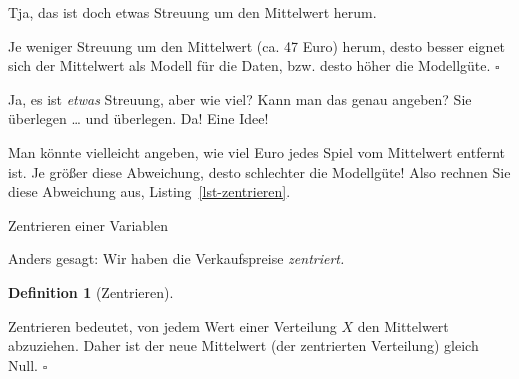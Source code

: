 \documentclass[
  letterpaper,
  oneside,
  open=any]{scrbook}
\newenvironment{Shaded}{\begin{snugshade}}{\end{snugshade}}
\newcommand{\AttributeTok}[1]{\textcolor[rgb]{0.40,0.45,0.13}{#1}}
\newcommand{\FloatTok}[1]{\textcolor[rgb]{0.68,0.00,0.00}{#1}}
\newcommand{\FunctionTok}[1]{\textcolor[rgb]{0.28,0.35,0.67}{#1}}
\newcommand{\NormalTok}[1]{\textcolor[rgb]{0.00,0.23,0.31}{#1}}
\newcommand{\OtherTok}[1]{\textcolor[rgb]{0.00,0.23,0.31}{#1}}
\newcommand{\SpecialCharTok}[1]{\textcolor[rgb]{0.37,0.37,0.37}{#1}}
\theoremstyle{definition}
\theoremstyle{definition}
\theoremstyle{definition}
\newtheorem{definition}{Definition}[chapter]
\theoremstyle{remark}
\begin{document}
Tja, das ist doch etwas Streuung um den Mittelwert herum.

\begin{tcolorbox}[enhanced jigsaw, bottomrule=.15mm, left=2mm, colbacktitle=quarto-callout-important-color!10!white, bottomtitle=1mm, colframe=quarto-callout-important-color-frame, coltitle=black, rightrule=.15mm, breakable, toptitle=1mm, titlerule=0mm, title=\textcolor{quarto-callout-important-color}{\faExclamation}\hspace{0.5em}{Wichtig}, opacitybacktitle=0.6, arc=.35mm, colback=white, leftrule=.75mm, opacityback=0, toprule=.15mm]

Je weniger Streuung um den Mittelwert (ca. 47 Euro) herum, desto besser
eignet sich der Mittelwert als Modell für die Daten, bzw. desto höher
die Modellgüte. \(\square\)

\end{tcolorbox}

Ja, es ist \emph{etwas} Streuung, aber wie viel? Kann man das genau
angeben? Sie überlegen \ldots{} und überlegen. Da! Eine Idee!

Man könnte vielleicht angeben, wie viel Euro jedes Spiel vom Mittelwert
entfernt ist. Je größer diese Abweichung, desto schlechter die
Modellgüte! Also rechnen Sie diese Abweichung aus,
Listing~\ref{lst-zentrieren}.

\begin{codelisting}

\caption{\label{lst-zentrieren}Zentrieren einer Variablen}

\centering{

\begin{Shaded}
\begin{Highlighting}[]
\NormalTok{mariokart\_no\_extreme }\OtherTok{\textless{}{-}}
\NormalTok{  mariokart\_no\_extreme }\SpecialCharTok{\%\textgreater{}\%} 
  \FunctionTok{mutate}\NormalTok{(}\AttributeTok{abw =} \FloatTok{47.4} \SpecialCharTok{{-}}\NormalTok{ total\_pr)}
\end{Highlighting}
\end{Shaded}

}

\end{codelisting}%

Anders gesagt: Wir haben die Verkaufspreise \emph{zentriert.}

\begin{definition}[Zentrieren]\protect\hypertarget{def-zentrieren}{}\label{def-zentrieren}

Zentrieren bedeutet, von jedem Wert einer Verteilung \(X\) den
Mittelwert abzuziehen. Daher ist der neue Mittelwert (der zentrierten
Verteilung) gleich Null. \(\square\)

\end{definition}
\end{document}
